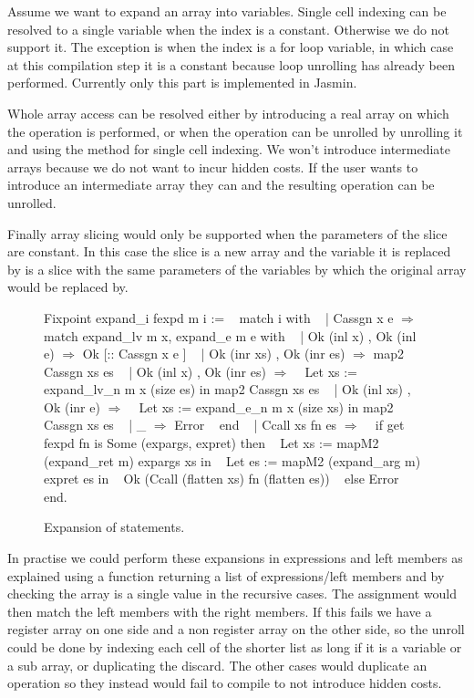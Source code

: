 \documentclass{article}
\begin{document}
Assume we want to expand an array into variables. Single cell indexing can be
resolved to a single variable when the index is a constant. Otherwise we do not
support it. The exception is when the index is a for loop variable, in which
case at this compilation step it is a constant because loop unrolling has
already been performed.
Currently only this part is implemented in Jasmin.

Whole array access can be resolved either by introducing a real array on which
the operation is performed, or when the operation can be unrolled by unrolling
it and using the method for single cell indexing. We won't introduce
intermediate arrays because we do not want to incur hidden costs. If the user
wants to introduce an intermediate array they can and the resulting operation
can be unrolled.

Finally array slicing would only be supported when the parameters of the slice
are constant. In this case the slice is a new array and the variable it is
replaced by is a slice with the same parameters of the variables by which the
original array would be replaced by.

\smallskip

\begin{figure}[t]
\obeylines\obeyspaces\ttfamily%
Fixpoint expand\_i fexpd m i :=
~ match i with
~ | Cassgn x e \(\Rightarrow\)
~   match expand\_lv m x, expand\_e m e     with
~   | Ok (inl x)       , Ok (inl e)       \(\Rightarrow\) Ok [:: Cassgn x e ]
~   | Ok (inr xs)      , Ok (inr es)      \(\Rightarrow\) map2 Cassgn xs es
~   | Ok (inl x)       , Ok (inr es)      \(\Rightarrow\)
~     Let xs := expand\_lv\_n m x (size es) in map2 Cassgn xs es
~   | Ok (inl xs)      , Ok (inr e)       \(\Rightarrow\)
~     Let xs := expand\_e\_n  m x (size xs) in map2 Cassgn xs es
~   | \_                                   \(\Rightarrow\) Error
~   end
~ | Ccall xs fn es \(\Rightarrow\)
~   if get fexpd fn is Some (expargs, expret) then
~     Let xs := mapM2 (expand\_ret m) expargs xs in
~     Let es := mapM2 (expand\_arg m) expret  es in
~     Ok (Ccall (flatten xs) fn (flatten es))
~   else Error
~ end.
\normalfont%
\caption{Expansion of statements.}
\end{figure}

In practise we could perform these expansions in expressions and left members
as explained using a function returning a list of expressions/left members and
by checking the array is a single value in the recursive cases. The assignment
would then match the left members with the right members. If this fails we have
a register array on one side and a non register array on the other side, so the
unroll could be done by indexing each cell of the shorter list as long if it is
a variable or a sub array, or duplicating the discard. The other cases would
duplicate an operation so they instead would fail to compile to not introduce
hidden costs.
\end{document}
